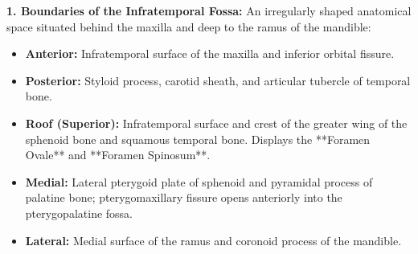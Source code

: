 \documentclass[11pt,a4paper]{article}
\begin{document}
\begin{ansbox}
\textbf{1. Boundaries of the Infratemporal Fossa:}
An irregularly shaped anatomical space situated behind the maxilla and deep to the ramus of the mandible:
\begin{itemize}[leftmargin=*]
    \item \textbf{Anterior:} Infratemporal surface of the maxilla and inferior orbital fissure.
    \item \textbf{Posterior:} Styloid process, carotid sheath, and articular tubercle of temporal bone.
    \item \textbf{Roof (Superior):} Infratemporal surface and crest of the greater wing of the sphenoid bone and squamous temporal bone. Displays the **Foramen Ovale** and **Foramen Spinosum**.
    \item \textbf{Medial:} Lateral pterygoid plate of sphenoid and pyramidal process of palatine bone; pterygomaxillary fissure opens anteriorly into the pterygopalatine fossa.
    \item \textbf{Lateral:} Medial surface of the ramus and coronoid process of the mandible.
\end{itemize}


\end{ansbox}
\end{document}
